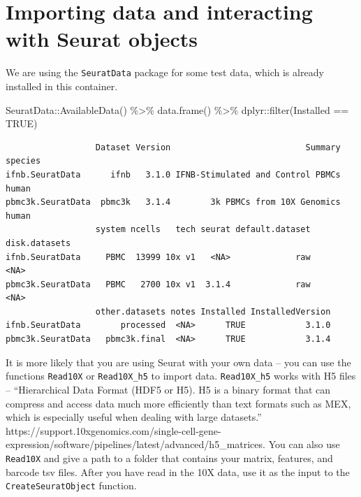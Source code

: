 \documentclass[
  letterpaper,
  DIV=11,
  numbers=noendperiod]{scrreprt}
\newenvironment{Shaded}{\begin{snugshade}}{\end{snugshade}}
\newcommand{\FunctionTok}[1]{\textcolor[rgb]{0.28,0.35,0.67}{#1}}
\newcommand{\NormalTok}[1]{\textcolor[rgb]{0.00,0.23,0.31}{#1}}
\newcommand{\SpecialCharTok}[1]{\textcolor[rgb]{0.37,0.37,0.37}{#1}}
\newcommand{\StringTok}[1]{\textcolor[rgb]{0.13,0.47,0.30}{#1}}
\begin{document}
\section{Importing data and interacting with Seurat
objects}\label{importing-data-and-interacting-with-seurat-objects}

We are using the \texttt{SeuratData} package for some test data, which
is already installed in this container.

\begin{Shaded}
\begin{Highlighting}[]
\NormalTok{SeuratData}\SpecialCharTok{::}\FunctionTok{AvailableData}\NormalTok{() }\SpecialCharTok{\%\textgreater{}\%} \FunctionTok{data.frame}\NormalTok{() }\SpecialCharTok{\%\textgreater{}\%}\NormalTok{ dplyr}\SpecialCharTok{::}\FunctionTok{filter}\NormalTok{(Installed }\SpecialCharTok{==} \StringTok{\textquotesingle{}TRUE\textquotesingle{}}\NormalTok{)}
\end{Highlighting}
\end{Shaded}

\begin{verbatim}
                  Dataset Version                           Summary species
ifnb.SeuratData      ifnb   3.1.0 IFNB-Stimulated and Control PBMCs   human
pbmc3k.SeuratData  pbmc3k   3.1.4        3k PBMCs from 10X Genomics   human
                  system ncells   tech seurat default.dataset disk.datasets
ifnb.SeuratData     PBMC  13999 10x v1   <NA>             raw          <NA>
pbmc3k.SeuratData   PBMC   2700 10x v1  3.1.4             raw          <NA>
                  other.datasets notes Installed InstalledVersion
ifnb.SeuratData        processed  <NA>      TRUE            3.1.0
pbmc3k.SeuratData   pbmc3k.final  <NA>      TRUE            3.1.4
\end{verbatim}

It is more likely that you are using Seurat with your own data -- you
can use the functions \texttt{Read10X} or \texttt{Read10X\_h5} to import
data. \texttt{Read10X\_h5} works with H5 files -- ``Hierarchical Data
Format (HDF5 or H5). H5 is a binary format that can compress and access
data much more efficiently than text formats such as MEX, which is
especially useful when dealing with large datasets.''
https://support.10xgenomics.com/single-cell-gene-expression/software/pipelines/latest/advanced/h5\_matrices.
You can also use \texttt{Read10X} and give a path to a folder that
contains your matrix, features, and barcode tsv files. After you have
read in the 10X data, use it as the input to the
\texttt{CreateSeuratObject} function.
\end{document}
